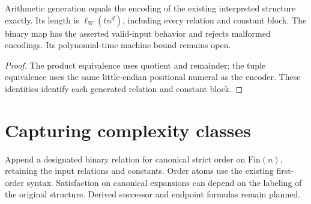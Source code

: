 \begin{theorem}
  \label{thm:desc-tagged-encoding}
  \leanok
  Arithmetic generation equals the encoding of the existing interpreted
  structure exactly. Its length is $\ell_W(t n^d)$, including every relation
  and constant block. The binary map has the asserted valid-input behavior and
  rejects malformed encodings. Its polynomial-time machine bound remains open.
\end{theorem}
\begin{proof}
  \leanok
  The product equivalence uses quotient and remainder; the tuple equivalence
  uses the same little-endian positional numeral as the encoder. These
  identities identify each generated relation and constant block.
\end{proof}

\section{Capturing complexity classes}

\begin{definition}
  \label{def:desc-ordered-fo}
  \leanok
  Append a designated binary relation for canonical strict order on
  $\mathrm{Fin}(n)$, retaining the input relations and constants. Order atoms
  use the existing first-order syntax. Satisfaction on canonical expansions
  can depend on the labeling of the original structure. Derived successor and
  endpoint formulas remain planned.
\end{definition}


